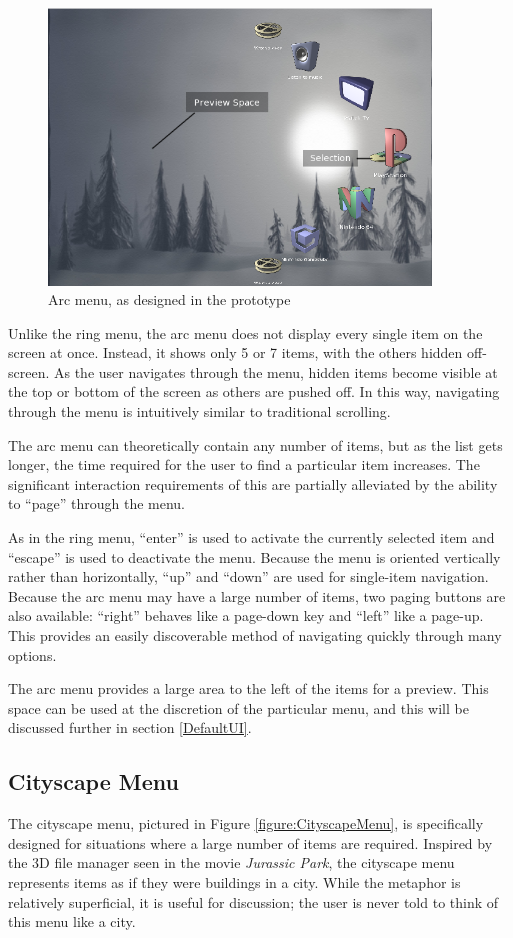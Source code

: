 \documentclass[letterpaper, titlepage, 11pt]{article}
\begin{document}
\begin{figure}[htb]
\centering
\includegraphics[width=4in]{figures/arc_menu}
\caption{Arc menu, as designed in the prototype\label{figure:ArcMenu}}
\end{figure}

Unlike the ring menu, the arc menu does not display every single item on the
screen at once.  Instead, it shows only 5 or 7 items, with the others hidden
off-screen.  As the user navigates through the menu, hidden items become
visible at the top or bottom of the screen as others are pushed off.  In this
way, navigating through the menu is intuitively similar to traditional
scrolling.

The arc menu can theoretically contain any number of items, but as the list
gets longer, the time required for the user to find a particular item
increases.  The significant interaction requirements of this are partially
alleviated by the ability to ``page'' through the menu.

As in the ring menu, ``enter'' is used to activate the currently selected item
and ``escape'' is used to deactivate the menu.  Because the menu is oriented
vertically rather than horizontally, ``up'' and ``down'' are used for
single-item navigation.  Because the arc menu may have a large number of items,
two paging buttons are also available: ``right'' behaves like a page-down key
and ``left'' like a page-up.  This provides an easily discoverable method of
navigating quickly through many options.

The arc menu provides a large area to the left of the items for a preview.
This space can be used at the discretion of the particular menu, and this
will be discussed further in section \ref{DefaultUI}.

\subsection{Cityscape Menu}
The cityscape menu, pictured in Figure \ref{figure:CityscapeMenu}, is
specifically designed for situations where a large number of items are
required.  Inspired by the 3D file manager seen in the movie
\textit{Jurassic Park}, the cityscape menu represents items as if they were
buildings in a city.  While the metaphor is relatively superficial, it
is useful for discussion; the user is never told to think of this menu like
a city.
\end{document}
